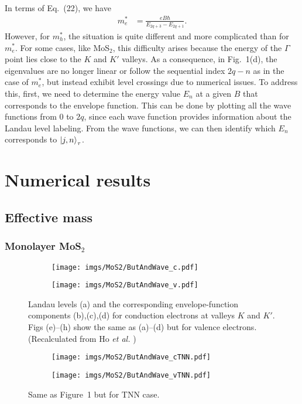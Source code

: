 \documentclass{article}
\begin{document}
In terms of Eq.~(22), we have
\begin{equation}
	\begin{aligned}
		m_{e}^{*} & = \frac{e B \hbar}{E_{2q+3} - E_{2q+1}}.
	\end{aligned}
\end{equation}
However, for $m_{h}^{*}$, the situation is quite different and more complicated than for $m_{e}^{*}$. For some cases, like MoS$_{2}$, this difficulty arises because the energy of the $\Gamma$ point lies close to the $K$ and $K'$ valleys.
As a consequence, in Fig.~1(d), the eigenvalues are no longer linear or follow the sequential index $2q-n$ as in the case of $m_{e}^{*}$, but instead exhibit level crossings due to numerical issues.
To address this, first, we need to determine the energy value $E_{n}$ at a given $B$ that corresponds to the envelope function.
This can be done by plotting all the wave functions from $0$ to $2q$, since each wave function provides information about the Landau level labeling.
From the wave functions, we can then identify which $E_{n}$ corresponds to $\ket{j,n}_{\tau}$.



\newpage
\section{Numerical results}
\subsection{Effective mass}
\subsubsection*{Monolayer MoS$_{2}$}

\begin{figure}[htb]
	\begin{subfigure}{0.495\textwidth}
		\centering
		\texttt{[image: imgs/MoS2/ButAndWave\_c.pdf]}
	\end{subfigure}
	\begin{subfigure}{0.495\textwidth}
		\centering
		\texttt{[image: imgs/MoS2/ButAndWave\_v.pdf]}
	\end{subfigure}
	\caption{Landau levels (a) and the corresponding envelope-function components (b),(c),(d) for conduction electrons at valleys $K$ and $K'$. Figs (e)–(h) show the same as (a)–(d) but for valence electrons. (Recalculated from Ho \textit{et al.} \cite{ho2014})}
\end{figure}
\begin{figure}[!h]
	\begin{subfigure}{0.495\textwidth}
		\centering
		\texttt{[image: imgs/MoS2/ButAndWave\_cTNN.pdf]}
	\end{subfigure}
	\begin{subfigure}{0.495\textwidth}
		\centering
		\texttt{[image: imgs/MoS2/ButAndWave\_vTNN.pdf]}
	\end{subfigure}
	\caption{Same as Figure~1 but for TNN case.}
\end{figure}
\end{document}

